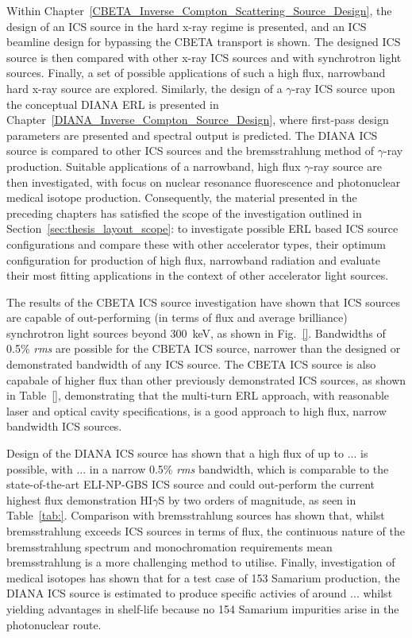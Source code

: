 \documentclass[../main.tex]{subfiles}
\begin{document}
Within Chapter~\ref{CBETA_Inverse_Compton_Scattering_Source_Design}, the design of an ICS source in the hard x-ray regime is presented, and an ICS beamline design for bypassing the CBETA transport is shown. The designed ICS source is then compared with other x-ray ICS sources and with synchrotron light sources. Finally, a set of possible applications of such a high flux, narrowband hard x-ray source are explored. Similarly, the design of a $\gamma$-ray ICS source upon the conceptual DIANA ERL is presented in Chapter~\ref{DIANA_Inverse_Compton_Source_Design}, where first-pass design parameters are presented and spectral output is predicted. The DIANA ICS source is compared to other ICS sources and the bremsstrahlung method of $\gamma$-ray production. Suitable applications of a narrowband, high flux $\gamma$-ray source are then investigated, with focus on nuclear resonance fluorescence and photonuclear medical isotope production. Consequently, the material presented in the preceding chapters has satisfied the scope of the investigation outlined in Section~\ref{sec:thesis_layout_scope}: to investigate possible ERL based ICS source configurations and compare these with other accelerator types, their optimum configuration for production of high flux, narrowband radiation and evaluate their most fitting applications in the context of other accelerator light sources.


The results of the CBETA ICS source investigation have shown that ICS sources are capable of out-performing (in terms of flux and average brilliance) synchrotron light sources beyond 300~\si{\kilo\electronvolt}, as shown in Fig.~\ref{}. Bandwidths  of 0.5\% \textit{rms} are possible for the CBETA ICS source, narrower than the designed or demonstrated bandwidth of any ICS source. The CBETA ICS source is also capabale of higher flux than other previously demonstrated ICS sources, as shown in Table~\ref{}, demonstrating that the multi-turn ERL approach, with reasonable laser and optical cavity specifications, is a good approach to high flux, narrow bandwidth ICS sources. 

Design of the DIANA ICS source has shown that a high flux of up to ... is possible, with ... in a narrow 0.5\% \textit{rms} bandwidth, which is comparable to the state-of-the-art ELI-NP-GBS \cite{elinp2019vega,tanaka2020current} ICS source and could out-perform the current highest flux demonstration HI$\gamma$S \cite{weller2009research} by two orders of magnitude, as seen in Table~\ref{tab:}. Comparison with bremsstrahlung sources has shown that, whilst bremsstrahlung exceeds ICS sources in terms of flux, the continuous nature of the bremsstrahlung spectrum and monochromation requirements mean bremsstrahlung is a more challenging method to utilise. Finally, investigation of medical isotopes has shown that for a test case of 153 Samarium production, the DIANA ICS source is estimated to produce specific activies of around ... whilst yielding advantages in shelf-life because no 154 Samarium impurities arise in the photonuclear route. 
\end{document}
